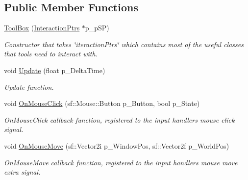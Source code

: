 \subsection*{Public Member Functions}
\begin{DoxyCompactItemize}
\item 
\mbox{\label{class_tool_box_a475f7f91136ff1b2bf6560d59ffe5030}} 
\hyperlink{class_tool_box_a475f7f91136ff1b2bf6560d59ffe5030}{Tool\+Box} (\hyperlink{struct_interaction_ptrs}{Interaction\+Ptrs} $\ast$p\+\_\+p\+SP)
\begin{DoxyCompactList}\small\item\em Constructor that takes \char`\"{}iteraction\+Ptrs\char`\"{} which contains most of the useful classes that tools need to interact with. \end{DoxyCompactList}\item 
\mbox{\label{class_tool_box_ac2512eeee3fb8915bb20eaa07f30bca0}} 
void \hyperlink{class_tool_box_ac2512eeee3fb8915bb20eaa07f30bca0}{Update} (float p\+\_\+\+Delta\+Time)
\begin{DoxyCompactList}\small\item\em Update function. \end{DoxyCompactList}\item 
\mbox{\label{class_tool_box_ac3414410d0d14deb45099e75b17a9fe4}} 
void \hyperlink{class_tool_box_ac3414410d0d14deb45099e75b17a9fe4}{On\+Mouse\+Click} (sf\+::\+Mouse\+::\+Button p\+\_\+\+Button, bool p\+\_\+\+State)
\begin{DoxyCompactList}\small\item\em On\+Mouse\+Click callback function, registered to the input handlers mouse click signal. \end{DoxyCompactList}\item 
\mbox{\label{class_tool_box_a08a321df9ac5a75abbd1a300d28ff117}} 
void \hyperlink{class_tool_box_a08a321df9ac5a75abbd1a300d28ff117}{On\+Mouse\+Move} (sf\+::\+Vector2i p\+\_\+\+Window\+Pos, sf\+::\+Vector2f p\+\_\+\+World\+Pos)
\begin{DoxyCompactList}\small\item\em On\+Mouse\+Move callback function, registered to the input handlers mouse move extra signal. \end{DoxyCompactList}\item 

\end{DoxyCompactItemize}

